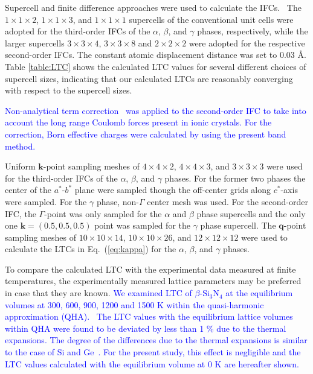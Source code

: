 \documentclass[twocolumn,amsmath,amssymb,a4paper,prb,superscriptaddress,floatfix]{revtex4-1}
\begin{document}
Supercell and finite difference approaches were used to calculate the
IFCs.~\cite{wei-supercell} The $1\times 1\times2$, $1\times 1\times3$, and
$1\times 1\times1$ supercells of the conventional unit cells were adopted for
the third-order IFCs of the $\alpha$, $\beta$, and $\gamma$ phases,
respectively, while the larger supercells $3\times 3\times4$, $3\times
3\times8$ and $2\times 2\times2$ were adopted for the respective second-order
IFCs.  The constant atomic displacement distance was set to 0.03 \AA.  Table
\ref{table:LTC} shows the calculated LTC values for several different choices
of supercell sizes, indicating that our calculated LTCs are reasonably
converging with respect to the supercell sizes. 

\textcolor{blue}{Non-analytical
term correction~\cite{wang} was applied to the second-order IFC to take
into account the long range Coulomb forces present in ionic crystals. For the correction,
Born effective charges were calculated by using the present band method.}

Uniform $\mathbf{k}$-point sampling meshes of $4\times 4\times 2$,
$4\times 4\times 3$, and $3\times 3\times 3$ were used for the
third-order IFCs of the $\alpha$, $\beta$, and $\gamma$ phases. For the
former two phases the center of the $a^*$-$b^*$ plane were sampled
though the off-center grids along $c^*$-axis were sampled. For the
$\gamma$ phase, non-$\Gamma$ center mesh was used. For the second-order
IFC, the $\Gamma$-point was only sampled for the $\alpha$ and $\beta$
phase supercells and the only one $\mathbf{k}=(0.5, 0.5, 0.5)$ point was
sampled for the $\gamma$ phase supercell. The $\mathbf{q}$-point
sampling meshes of $10\times 10\times 14$, $10\times 10\times 26$, and
$12\times 12\times 12$ were used to calculate the LTCs in Eq.~(\ref{eq:kappa})
for the $\alpha$, $\beta$, and $\gamma$ phases.

To compare the calculated LTC with the experimental data measured at finite
temperatures, the experimentally measured lattice parameters may be preferred
in case that they are known. \textcolor{blue}{We examined LTC of $\beta$-Si$_3$N$_4$ at the
equilibrium volumes at 300, 600, 900, 1200 and 1500 K within the quasi-harmonic
approximation (QHA).~\cite{dove-p76} The LTC values with the equilibrium
lattice volumes within QHA were found to be deviated by less than 1 \% due to
the thermal expansions. The degree of the differences due to the thermal
expansions is similar to the case of Si and Ge~\cite{ward-ltc}. For the present
study, this effect is negligible and the LTC values calculated with the
equilibrium volume at 0 K are hereafter shown.}
\end{document}
